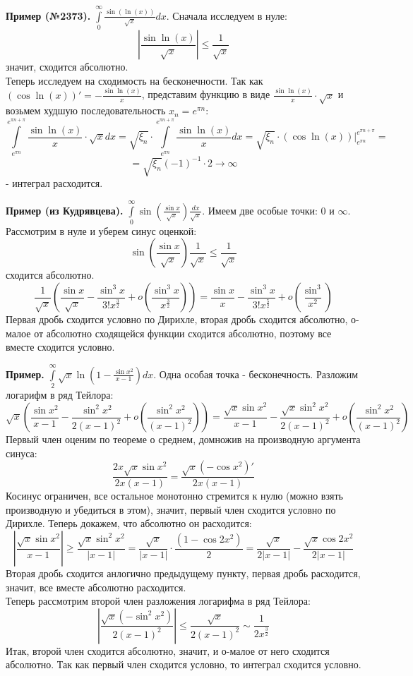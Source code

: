 \textbf{Пример (№2373).}
$\int\limits_{0}^{\infty}\frac{\sin(\ln(x))}{\sqrt{x}}dx$. Сначала исследуем
в нуле:
$$\left| \frac{\sin\ln(x)}{\sqrt{x}} \right|\leqslant \frac{1}{\sqrt{x}}$$ 
значит, сходится абсолютно.\\
Теперь исследуем на сходимость на бесконечности. Так как 
$(\cos\ln(x))'=- \frac{\sin\ln(x)}{x}$, представим функцию в виде 
$\frac{\sin\ln(x)}{x}\cdot \sqrt{x}$ и возьмем худшую последовательность
$x_n=e^{\pi n}$:
$$\int\limits_{e^{\pi n}}^{e^{\pi n+\pi}}\frac{\sin\ln(x)}{x}\cdot\sqrt{x}dx=
\sqrt{\xi_n}\cdot\int\limits_{e^{\pi n}}^{e^{\pi n+\pi}}\frac{\sin\ln(x)}{x}dx=
\sqrt{\xi_n}\cdot(\cos\ln(x))\big|_{e^{\pi n}}^{e^{\pi n+\pi}}=
$$ $$=\sqrt{\xi_n}(-1)^{-1}\cdot 2\to \infty$$
- интеграл расходится.


\textbf{Пример (из Кудрявцева).} 
$\int\limits_{0}^{\infty}\sin
\left(\frac{\sin x}{\sqrt{x}}\right)\frac{dx}{\sqrt{x}}$. Имеем две особые 
точки: $0$ и  $\infty$. Рассмотрим в нуле и уберем синус оценкой:
$$\sin\left(\frac{\sin x}{\sqrt{x}}\right)\frac{1}{\sqrt{x}}\leqslant 
\frac{1}{\sqrt{x}}$$
сходится абсолютно.\\
$$\frac{1}{\sqrt{x}}\left(\frac{\sin x}{\sqrt{x}}-
\frac{\sin^3x}{3!x^{\frac{3}{2}}}+o\left( \frac{\sin^3x}{x^{\frac{3}{2}}}
\right)\right)=\frac{\sin x}{x}-\frac{\sin^3x}{3!x^{\frac{5}{2}}}+
o\left( \frac{\sin^3}{x^2} \right) $$
Первая дробь сходится условно по Дирихле, вторая дробь сходится абсолютно,
о-малое от абсолютно сходящейся функции сходится абсолютно, поэтому все 
вместе сходится условно. 

\textbf{Пример.} $\int\limits_{2}^{\infty} \sqrt{x}\ln\left( 1-
\frac{\sin x^2}{x-1}\right)dx$. Одна особая точка - бесконечность. 
Разложим логарифм в ряд Тейлора:
$$\sqrt{x}\left( \frac{\sin x^2}{x-1}-\frac{\sin^2x^2}{2(x-1)^2}+
o\left( \frac{\sin^2x^2}{(x-1)^2} \right) \right)=
\frac{\sqrt{x} \sin x^2}{x-1}-\frac{\sqrt{x}\sin^2x^2}{2(x-1)^2}+
o\left( \frac{\sin^2x^2}{(x-1)^2} \right)$$
Первый член оценим по теореме о среднем, домножив на производную
аргумента синуса:
$$\frac{2x\sqrt{x}\sin x^2}{2x(x-1)}=\frac{\sqrt{x}(-\cos x^2)'}{2x(x-1)}$$ 
Косинус ограничен, все остальное монотонно стремится к нулю (можно взять 
производную и убедиться в этом), значит, первый член сходится условно по 
Дирихле. Теперь докажем, что абсолютно он расходится:
$$\left| \frac{\sqrt{x}\sin x^2}{x-1}\right|\geqslant
\frac{\sqrt{x}\sin^2x^2 }{|x-1|}=\frac{\sqrt{x}}{|x-1|}\cdot 
\frac{(1-\cos2x^2)}{2}=\frac{\sqrt{x}}{2|x-1|}-
\frac{\sqrt{x}\cos2x^2}{2|x-1|}$$ 
Вторая дробь сходится анлогично предыдущему пункту, первая дробь расходится,
значит, все вместе абсолютно расходится.\\
Теперь рассмотрим второй член разложения логарифма в ряд Тейлора:
$$\left| \frac{\sqrt{x}(-\sin^2x^2) }{2(x-1)^2} \right|\leqslant 
\frac{\sqrt{x} }{2(x-1)^2}\sim \frac{1}{2x^{\frac{3}{2}}}$$
Итак, второй член сходится абсолютно, значит, и о-малое от него сходится 
абсолютно. Так как первый член сходится условно, то интеграл сходится условно.

